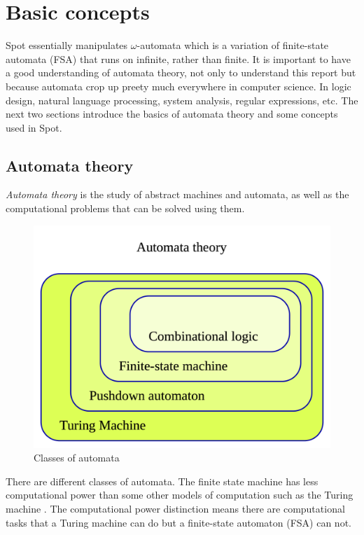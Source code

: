 \chapter{Basic concepts}
Spot essentially manipulates $\omega$-automata which is a variation of finite-state automata (FSA) that runs
on infinite, rather than finite. It is important to have a good understanding of automata theory,
not only to understand this report but because automata crop up preety much everywhere in computer
science. In logic design, natural language processing, system analysis, regular expressions, etc. The next
two sections introduce the basics of automata theory and some concepts used in Spot.

\section{Automata theory}
\textit{Automata theory} \cite{9} is the study of abstract machines and automata, as well as the
computational problems that can be solved using them.

\begin{figure}[H]
 \centering
 \includegraphics[scale=0.2]{img/automata_classes.png}
 \caption{Classes of automata \cite{9}}
 \label{fig:aut_classes}
\end{figure}
There are different classes of automata. The finite state machine has less computational power than
some other models of computation such as the Turing machine \cite{10}. The computational power distinction
means there are computational tasks that a Turing machine can do but a finite-state automaton (FSA) can
not.

